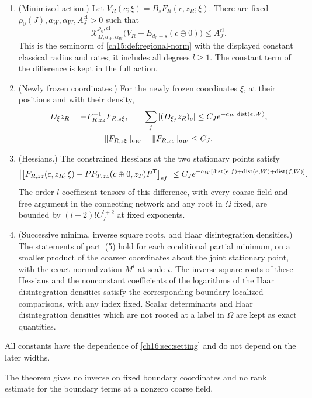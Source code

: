 \begin{theorem}
\begin{enumerate}
\item (Minimized action.) Let $V_R(c;\xi)=B_sF_R(c,z_R;\xi)$. There are fixed $\rho_0(J),a_W,\alpha_W,A_J^{\mathrm{cl}}>0$ such that
\[
 \mathcal X_{\Omega,a_W,\alpha_W}^{\rho_0,\mathrm{cl}}
       \bigl(V_R-E_{d_0+s}(c\oplus0)\bigr)\le A_J^{\mathrm{cl}}.
\]
This is the seminorm of \cref{ch15:def:regional-norm} with the displayed constant classical radius and rates; it includes all degrees $l\ge1$. The constant term of the difference is kept in the full action.
\item (Newly frozen coordinates.) For the newly frozen coordinates $\xi$, at their positions and with their density,
\[
 \begin{gathered}
 D_\xi z_R=-F_{R,zz}^{-1}F_{R,z\xi},\qquad
 \sum_f|(D_{\xi_f}z_R)_e|\le C_Je^{-a_W\operatorname{dist}(e,W)},\\
 \|F_{R,z\xi}\|_{a_W}+\|F_{R,zc}\|_{a_W}\le C_J.
 \end{gathered}
\]
\item (Hessians.) The constrained Hessians at the two stationary points satisfy
\[
 \bigl|\bigl[F_{R,zz}(c,z_R;\xi)
       -PF_{T,zz}(c\oplus0,z_T)P^{\mathsf T}\bigr]_{ef}\bigr|
 \le C_Je^{-a_W[\operatorname{dist}(e,f)+\operatorname{dist}(e,W)+\operatorname{dist}(f,W)]}.
\]
The order-$l$ coefficient tensors of this difference, with every coarse-field and free argument in the connecting network and any root in $\Omega$ fixed, are bounded by $(l+2)!C_J^{l+2}$ at fixed exponents.
\item (Successive minima, inverse square roots, and Haar disintegration densities.) The statements of part~(5) hold for each conditional partial minimum, on a smaller product of the coarser coordinates about the joint stationary point, with the exact normalization $M^i$ at scale $i$. The inverse square roots of these Hessians and the nonconstant coefficients of the logarithms of the Haar disintegration densities satisfy the corresponding boundary-localized comparisons, with any index fixed. Scalar determinants and Haar disintegration densities which are not rooted at a label in $\Omega$ are kept as exact quantities.
\end{enumerate}
All constants have the dependence of \cref{ch16:sec:setting} and do not depend on the later widths.
\end{theorem}

The theorem gives no inverse on fixed boundary coordinates and no rank estimate for the boundary terms at a nonzero coarse field.

